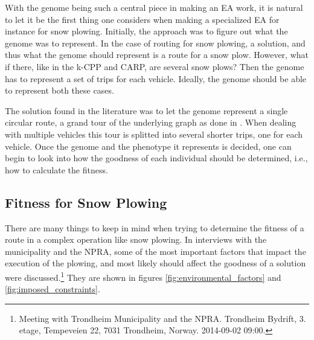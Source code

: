 With the genome being such a central piece in making an EA work, it is natural to let it be the first thing one considers when making a specialized EA for instance for snow plowing. Initially, the approach was to figure out what the genome was to represent. In the case of routing for snow plowing, a solution, and thus what the genome should represent is a route for a snow plow. However, what if there, like in the k-CPP and CARP, are several snow plows? Then the genome has to represent a set of trips for each vehicle. Ideally, the genome should be able to represent both these cases.

The solution found in the literature was to let the genome represent a single circular route, a grand tour of the underlying graph as done in \citet{lacomme2001GA}. When dealing with multiple vehicles this tour is splitted into several shorter trips, one for each vehicle. Once the genome and the phenotype it represents is decided, one can begin to look into how the goodness of each individual should be determined, i.e., how to calculate the fitness.

\subsection{Fitness for Snow Plowing} %
\label{sub:fitness_for_snow_plowing}

There are many things to keep in mind when trying to determine the fitness of a route in a complex operation like snow plowing. In interviews with the municipality and the NPRA, some of the most important factors that impact the execution of the plowing, and most likely should affect the goodness of a solution were discussed.\footnote{Meeting with Trondheim Municipality and the NPRA. Trondheim Bydrift, 3. etage, Tempeveien 22, 7031 Trondheim, Norway. 2014-09-02 09:00.} They are shown in figures \ref{fig:environmental_factors} and \ref{fig:imposed_constraints}.

